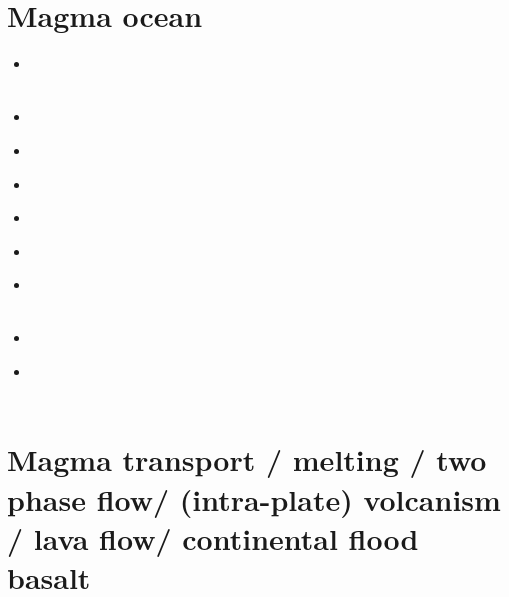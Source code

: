\section{Magma ocean}

\begin{scriptsize}
\begin{itemize}
\item[\nineteenninetythree] 
\textcite{sost93a} \\
\textcite{sost93b} \\
\item[\twothousandtwo] 
\textcite{elvh02} \\
\item[\twothousandsix] 
\textcite{hosh06} \\
\item[\twothousandseven] 
\textcite{solo07} \\
\item[\twothousandten] 
\textcite{devv10} \\
\item[\twothousandtwelve] 
\textcite{ullc12} \\
\item[\twothousandthirteen] 
\textcite{plth13}  \\
\textcite{moha13} \\
\item[\twothousandfifteen] 
\textcite{maha15} \\
\item[\twothousandtwenty] 
\textcite{bobm20} \\
\textcite{agml20} \\
\end{itemize}
\end{scriptsize}

\section{Magma transport / melting / two phase flow/ (intra-plate) volcanism / lava flow/ 
continental flood basalt}

